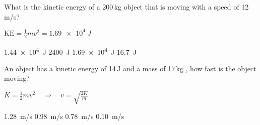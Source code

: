 \documentclass[]{exam}
\begin{document}
\begin{questions}









\question %
What is the kinetic energy of a 200\,kg object that is moving with a speed of 12\,m/s?

\ifprintanswers
{\color{red} $\mathrm{KE} = \frac{1}{2}mv^2 = \boxed{\SI{1.69e4}{J}}$}
\fi

\begin{randomizechoices}
    \correctchoice \SI{1.44e4}{J}
    \choice \SI{2400}{J}
    \choice \SI{1.69e4}{J}
    \choice \SI{16.7}{J}
\end{randomizechoices}

\question %
An object has a kinetic energy of 14\,J and a mass of 17\,kg , how fast is the object moving? 

\ifprintanswers
{\color{red}
$K = \frac{1}{2} m v^2 \quad \Rightarrow \quad v = \sqrt{\frac{2K}{m}}$
}
\fi

\begin{randomizechoices}
    \correctchoice \SI{1.28}{m/s}
    \choice \SI{0.98}{m/s}
    \choice \SI{0.78}{m/s}
    \choice \SI{0.10}{m/s}
\end{randomizechoices}




\end{questions}
\end{document}
